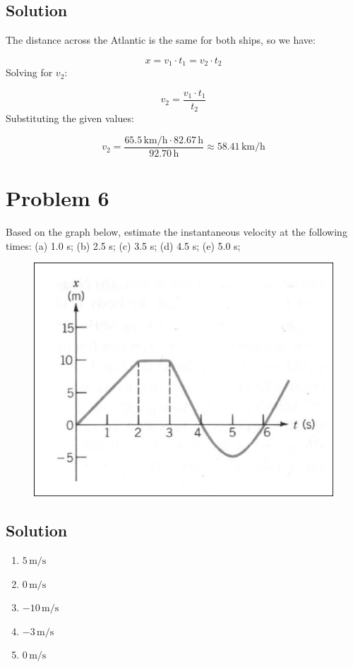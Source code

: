 \documentclass{article}
\newcommand{\kilo}{\text{k}}
\newcommand{\meter}{\text{m}}
\newcommand{\second}{\text{s}}
\begin{document}
\subsection*{Solution}
The distance across the Atlantic is the same for both ships, so we have:

\[
x = v_1 \cdot t_1 = v_2 \cdot t_2
\]
Solving for \( v_2 \):

\[
v_2 = \frac{v_1 \cdot t_1}{t_2}
\]
Substituting the given values:

\[
v_2 = \frac{65.5 \, \si{\kilo\meter\per\hour} \cdot 82.67 \, \si{\hour}}{92.70 \, \si{\hour}} \approx 58.41 \, \si{\kilo\meter\per\hour}
\]

\section*{Problem 6}
Based on the graph below, estimate the instantaneous velocity at the following times: (a) 1.0 s; (b) 2.5 s; (c) 3.5 s; (d) 4.5 s; (e) 5.0 s;

\begin{figure}[h]
    \centering
    \includegraphics[scale=0.5]{graph.png}
    \label{fig:my_graph}
\end{figure}

\subsection*{Solution}

\begin{enumerate}[label=(\alph*)]
    \item \(5 \, \si{\meter\per\second}\)
    \item \(0 \, \si{\meter\per\second}\)
    \item \(-10 \, \si{\meter\per\second}\)
    \item \(-3 \, \si{\meter\per\second}\)
    \item \(0 \, \si{\meter\per\second}\)
\end{enumerate}
\end{document}

